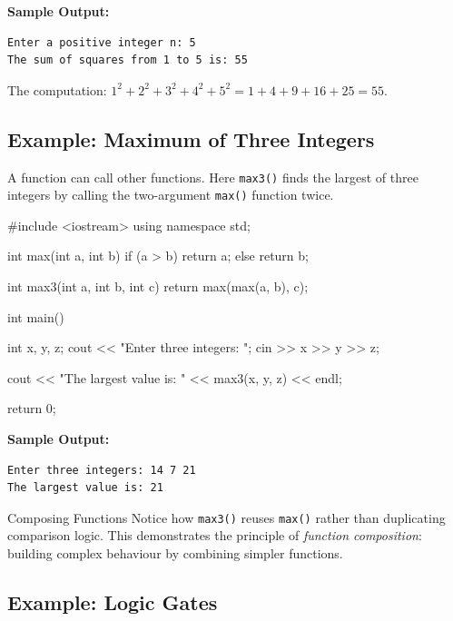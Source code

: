 \noindent\textbf{Sample Output:}
\begin{verbatim}
Enter a positive integer n: 5
The sum of squares from 1 to 5 is: 55
\end{verbatim}

\noindent The computation:
$1^{2} + 2^{2} + 3^{2} + 4^{2} + 5^{2} = 1 + 4 + 9 + 16 + 25 = 55$.

\subsection{Example: Maximum of Three Integers}
\label{subsec:max-of-three}

A function can call other functions. Here \texttt{max3()} finds the largest
of three integers by calling the two-argument \texttt{max()} function twice.

\begin{cppcode}
#include <iostream>
using namespace std;

int max(int a, int b)
{
    if (a > b)
        return a;
    else
        return b;
}

int max3(int a, int b, int c)
{
    return max(max(a, b), c);
}

int main()
{
    int x, y, z;
    cout << "Enter three integers: ";
    cin >> x >> y >> z;

    cout << "The largest value is: "
         << max3(x, y, z) << endl;

    return 0;
}
\end{cppcode}

\noindent\textbf{Sample Output:}
\begin{verbatim}
Enter three integers: 14 7 21
The largest value is: 21
\end{verbatim}

\begin{infobox}{Composing Functions}
Notice how \texttt{max3()} reuses \texttt{max()} rather than duplicating
comparison logic. This demonstrates the principle of \emph{function
composition}: building complex behaviour by combining simpler functions.
\end{infobox}

\subsection{Example: Logic Gates}
\label{subsec:logic-gates}

